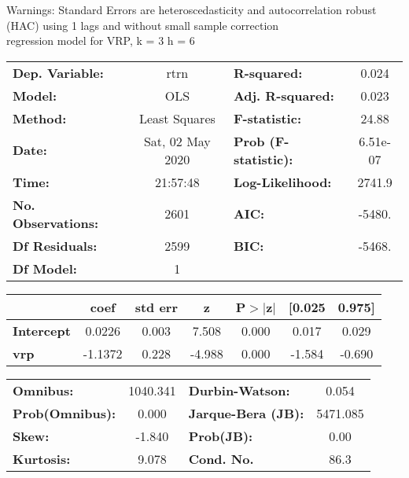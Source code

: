 Warnings: \newline
 [1] Standard Errors are heteroscedasticity and autocorrelation robust (HAC) using 1 lags and without small sample correction\\ 

regression model for VRP, k = 3 h = 6\begin{center}
\begin{tabular}{lclc}
\toprule
\textbf{Dep. Variable:}    &       rtrn       & \textbf{  R-squared:         } &     0.024   \\
\textbf{Model:}            &       OLS        & \textbf{  Adj. R-squared:    } &     0.023   \\
\textbf{Method:}           &  Least Squares   & \textbf{  F-statistic:       } &     24.88   \\
\textbf{Date:}             & Sat, 02 May 2020 & \textbf{  Prob (F-statistic):} &  6.51e-07   \\
\textbf{Time:}             &     21:57:48     & \textbf{  Log-Likelihood:    } &    2741.9   \\
\textbf{No. Observations:} &        2601      & \textbf{  AIC:               } &    -5480.   \\
\textbf{Df Residuals:}     &        2599      & \textbf{  BIC:               } &    -5468.   \\
\textbf{Df Model:}         &           1      & \textbf{                     } &             \\
\bottomrule
\end{tabular}
\begin{tabular}{lcccccc}
                   & \textbf{coef} & \textbf{std err} & \textbf{z} & \textbf{P$> |$z$|$} & \textbf{[0.025} & \textbf{0.975]}  \\
\midrule
\textbf{Intercept} &       0.0226  &        0.003     &     7.508  &         0.000        &        0.017    &        0.029     \\
\textbf{vrp}       &      -1.1372  &        0.228     &    -4.988  &         0.000        &       -1.584    &       -0.690     \\
\bottomrule
\end{tabular}
\begin{tabular}{lclc}
\textbf{Omnibus:}       & 1040.341 & \textbf{  Durbin-Watson:     } &    0.054  \\
\textbf{Prob(Omnibus):} &   0.000  & \textbf{  Jarque-Bera (JB):  } & 5471.085  \\
\textbf{Skew:}          &  -1.840  & \textbf{  Prob(JB):          } &     0.00  \\
\textbf{Kurtosis:}      &   9.078  & \textbf{  Cond. No.          } &     86.3  \\
\bottomrule
\end{tabular}
\end{center}

